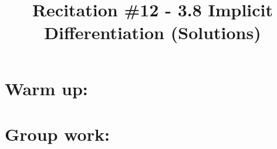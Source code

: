 \documentclass[nooutcomes]{ximera}
\title{Recitation \#12 - 3.8 Implicit Differentiation (Solutions)}
\begin{document}
\begin{abstract}		\end{abstract}
\maketitle

\section*{Warm up:} 

	\begin{freeResponse}
	
	\end{freeResponse}	
	
	
	
	
	

\section*{Group work:}



\begin{problem}
		\begin{freeResponse}
		
		\end{freeResponse}
			
			
	
\end{problem}
















\begin{problem}

			\begin{freeResponse}
			
			\end{freeResponse}
			
			
			
		
\end{problem}
	
	
	
	
	
	
	
	
			
			

\begin{problem}

		\begin{freeResponse}
		
		\end{freeResponse}
		
		
		
	
		
\end{problem}
\end{document}
